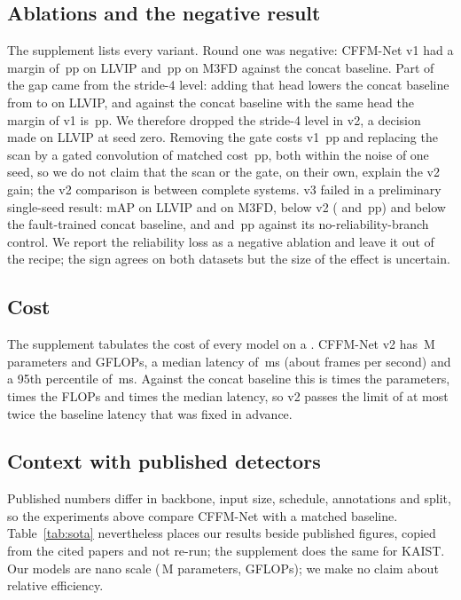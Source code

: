 \subsection{Ablations and the negative result}
\label{sec:ablation}
The supplement lists every variant. Round one was negative: CFFM-Net v1 had a margin of \marLlvipVoneVsConcatPlainSeedZeroMap{}\,pp on LLVIP and \marMfdVoneVsConcatPlainSeedZeroMap{}\,pp on M3FD against the concat baseline. Part of the gap came from the stride-4 level: adding that head lowers the concat baseline from \resLlvipConcatPlainSeedZeroMap{} to \resLlvipConcatPtwoSeedZeroMap{} on LLVIP, and against the concat baseline with the same head the margin of v1 is \marLlvipVoneVsConcatPtwoSeedZeroMap{}\,pp. We therefore dropped the stride-4 level in v2, a decision made on LLVIP at seed zero. Removing the gate costs v1 \marLlvipVoneVsVoneNogateSeedZeroMap{}\,pp and replacing the scan by a gated convolution of matched cost \marLlvipVoneVsVoneGconvSeedZeroMap{}\,pp, both within the noise of one seed, so we do not claim that the scan or the gate, on their own, explain the v2 gain; the v2 comparison is between complete systems. v3 failed in a preliminary single-seed result: \resLlvipCffmVthreeSeedZeroMap{} mAP on LLVIP and \resMfdCffmVthreeSeedZeroMap{} on M3FD, below v2 (\marLlvipVthreeVsVtwoSeedZeroMap{} and \marMfdVthreeVsVtwoSeedZeroMap{}\,pp) and below the fault-trained concat baseline, and \marLlvipVthreeVsVthreeNorelSeedZeroMap{} and \marMfdVthreeVsVthreeNorelSeedZeroMap{}\,pp against its no-reliability-branch control. We report the reliability loss as a negative ablation and leave it out of the recipe; the sign agrees on both datasets but the size of the effect is uncertain.

\subsection{Cost}
\label{sec:cost}
The supplement tabulates the cost of every model on a \latLocalDevice{}. CFFM-Net v2 has \latLocalVtwoParamsM{}\,M parameters and \latLocalVtwoGflops{} GFLOPs, a median latency of \latLocalVtwoMedianMs{}\,ms (about \latLocalVtwoFps{} frames per second) and a 95th percentile of \latLocalVtwoPNinetyFiveMs{}\,ms. Against the concat baseline this is \latLocalRatioParams{} times the parameters, \latLocalRatioGflops{} times the FLOPs and \latLocalRatioMedian{} times the median latency, so v2 passes the limit of at most twice the baseline latency that was fixed in advance.

\subsection{Context with published detectors}
\label{sec:sota}
Published numbers differ in backbone, input size, schedule, annotations and split, so the experiments above compare CFFM-Net with a matched baseline. Table~\ref{tab:sota} nevertheless places our results beside published figures, copied from the cited papers and not re-run; the supplement does the same for KAIST. Our models are nano scale (\latLocalVtwoParamsM{}\,M parameters, \latLocalVtwoGflops{} GFLOPs); we make no claim about relative efficiency.


